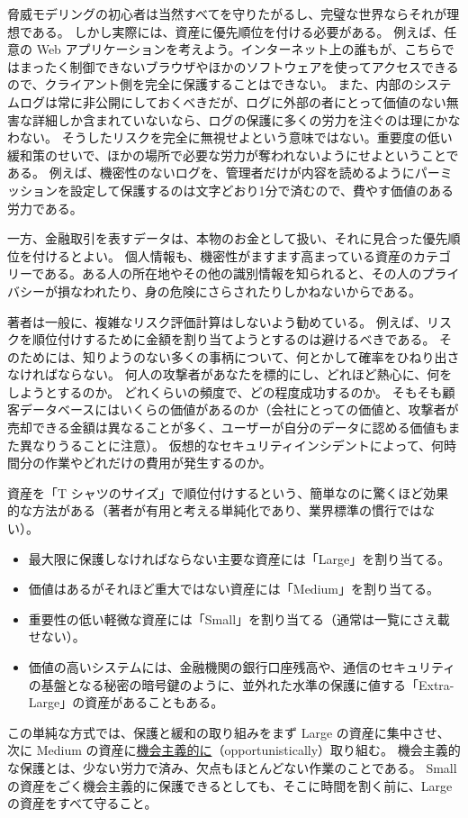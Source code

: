 \documentclass[uplatex]{jsarticle}
\def\label#1{}%
\begin{document}
脅威モデリングの初心者は当然すべてを守りたがるし、完璧な世界ならそれが理想である。
しかし実際には、資産に優先順位を付ける必要がある。
例えば、任意の Web アプリケーションを考えよう。インターネット上の誰もが、こちらではまったく制御できないブラウザやほかのソフトウェアを使ってアクセスできるので、クライアント側を完全に保護することはできない。
また、内部のシステムログは常に非公開にしておくべきだが、ログに外部の者にとって価値のない無害な詳細しか含まれていないなら、ログの保護に多くの労力を注ぐのは理にかなわない。
そうしたリスクを完全に無視せよという意味ではない。重要度の低い緩和策のせいで、ほかの場所で必要な労力が奪われないようにせよということである。
例えば、機密性のないログを、管理者だけが内容を読めるようにパーミッションを設定して保護するのは文字どおり1分で済むので、費やす価値のある労力である。

一方、金融取引を表すデータは、本物のお金として扱い、それに見合った優先順位を付けるとよい。
個人情報も、機密性がますます高まっている資産のカテゴリーである。ある人の所在地やその他の識別情報を知られると、その人のプライバシーが損なわれたり、身の危険にさらされたりしかねないからである。

\begin{rem}[複雑なリスク評価計算を避ける]\label{rem:ch2-avoid-risk-calculations}
著者は一般に、複雑なリスク評価計算はしないよう勧めている。
例えば、リスクを順位付けするために金額を割り当てようとするのは避けるべきである。
そのためには、知りようのない多くの事柄について、何とかして確率をひねり出さなければならない。
何人の攻撃者があなたを標的にし、どれほど熱心に、何をしようとするのか。
どれくらいの頻度で、どの程度成功するのか。
そもそも顧客データベースにはいくらの価値があるのか（会社にとっての価値と、攻撃者が売却できる金額は異なることが多く、ユーザーが自分のデータに認める価値もまた異なりうることに注意）。
仮想的なセキュリティインシデントによって、何時間分の作業やどれだけの費用が発生するのか。
\end{rem}

\begin{dfn}[T シャツサイズによる資産の順位付け]\label{dfn:ch2-tshirt-sizes}
資産を「T シャツのサイズ」で順位付けするという、簡単なのに驚くほど効果的な方法がある（著者が有用と考える単純化であり、業界標準の慣行ではない）。
\begin{itemize}
\item 最大限に保護しなければならない主要な資産には「Large」を割り当てる。
\item 価値はあるがそれほど重大ではない資産には「Medium」を割り当てる。
\item 重要性の低い軽微な資産には「Small」を割り当てる（通常は一覧にさえ載せない）。
\item 価値の高いシステムには、金融機関の銀行口座残高や、通信のセキュリティの基盤となる秘密の暗号鍵のように、並外れた水準の保護に値する「Extra-Large」の資産があることもある。
\end{itemize}
この単純な方式では、保護と緩和の取り組みをまず Large の資産に集中させ、次に Medium の資産に\underline{機会主義的に}（opportunistically）取り組む。
機会主義的な保護とは、少ない労力で済み、欠点もほとんどない作業のことである。
Small の資産をごく機会主義的に保護できるとしても、そこに時間を割く前に、Large の資産をすべて守ること。
\end{dfn}
\end{document}
